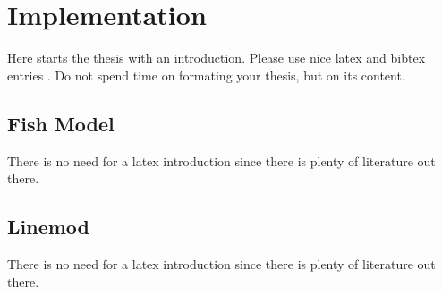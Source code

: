 \chapter{Implementation}
\label{chapter:Implementation}



Here starts the thesis with an introduction. Please use nice latex and bibtex entries \cite{latex}. Do not spend time on formating your thesis, but on its content. 
 
\section{Fish Model}
There is no need for a latex introduction since there is plenty of literature out there.
 

\section{Linemod}
There is no need for a latex introduction since there is plenty of literature out there.


